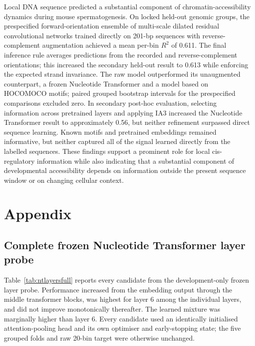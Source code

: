 \documentclass[a4paper,12pt]{article}
\begin{document}
Local DNA sequence predicted a substantial component of chromatin-accessibility dynamics during mouse spermatogenesis. On locked held-out genomic groups, the prespecified forward-orientation ensemble of multi-scale dilated residual convolutional networks trained directly on 201-bp sequences with reverse-complement augmentation achieved a mean per-bin $R^2$ of 0.611. The final inference rule averages predictions from the recorded and reverse-complement orientations; this increased the secondary held-out result to 0.613 while enforcing the expected strand invariance. The raw model outperformed its unaugmented counterpart, a frozen Nucleotide Transformer and a model based on HOCOMOCO motifs; paired grouped bootstrap intervals for the prespecified comparisons excluded zero. In secondary post-hoc evaluation, selecting information across pretrained layers and applying IA3 increased the Nucleotide Transformer result to approximately 0.56, but neither refinement surpassed direct sequence learning. Known motifs and pretrained embeddings remained informative, but neither captured all of the signal learned directly from the labelled sequences. These findings support a prominent role for local cis-regulatory information while also indicating that a substantial component of developmental accessibility depends on information outside the present sequence window or on changing cellular context.

\clearpage


\section*{Appendix}

\subsection*{Complete frozen Nucleotide Transformer layer probe}

Table~\ref{tab:ntlayersfull} reports every candidate from the development-only frozen layer probe. Performance increased from the embedding output through the middle transformer blocks, was highest for layer 6 among the individual layers, and did not improve monotonically thereafter. The learned mixture was marginally higher than layer 6. Every candidate used an identically initialised attention-pooling head and its own optimiser and early-stopping state; the five grouped folds and raw 20-bin target were otherwise unchanged.
\end{document}
